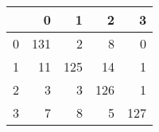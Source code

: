 \begin{tabular}{lrrrr}
\toprule
{} &    0 &    1 &    2 &    3 \\
\midrule
0 &  131 &    2 &    8 &    0 \\
1 &   11 &  125 &   14 &    1 \\
2 &    3 &    3 &  126 &    1 \\
3 &    7 &    8 &    5 &  127 \\
\bottomrule
\end{tabular}
